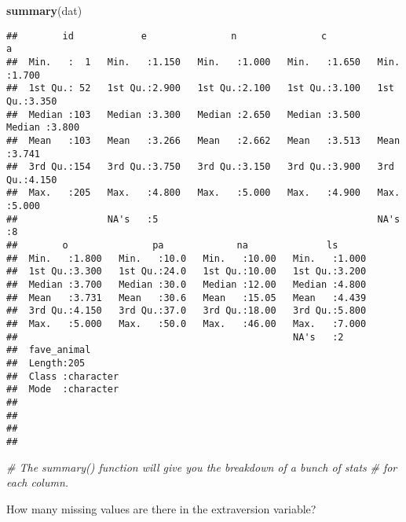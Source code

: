 \documentclass[
]{article}
\newenvironment{Shaded}{\begin{snugshade}}{\end{snugshade}}
\newcommand{\CommentTok}[1]{\textcolor[rgb]{0.56,0.35,0.01}{\textit{#1}}}
\newcommand{\FunctionTok}[1]{\textcolor[rgb]{0.13,0.29,0.53}{\textbf{#1}}}
\newcommand{\NormalTok}[1]{#1}
\newcommand{\SpecialCharTok}[1]{\textcolor[rgb]{0.81,0.36,0.00}{\textbf{#1}}}
\begin{document}
\begin{Shaded}
\begin{Highlighting}[]
\FunctionTok{summary}\NormalTok{(dat)}
\end{Highlighting}
\end{Shaded}

\begin{verbatim}
##        id            e               n               c               a        
##  Min.   :  1   Min.   :1.150   Min.   :1.000   Min.   :1.650   Min.   :1.700  
##  1st Qu.: 52   1st Qu.:2.900   1st Qu.:2.100   1st Qu.:3.100   1st Qu.:3.350  
##  Median :103   Median :3.300   Median :2.650   Median :3.500   Median :3.800  
##  Mean   :103   Mean   :3.266   Mean   :2.662   Mean   :3.513   Mean   :3.741  
##  3rd Qu.:154   3rd Qu.:3.750   3rd Qu.:3.150   3rd Qu.:3.900   3rd Qu.:4.150  
##  Max.   :205   Max.   :4.800   Max.   :5.000   Max.   :4.900   Max.   :5.000  
##                NA's   :5                                       NA's   :8      
##        o               pa             na              ls       
##  Min.   :1.800   Min.   :10.0   Min.   :10.00   Min.   :1.000  
##  1st Qu.:3.300   1st Qu.:24.0   1st Qu.:10.00   1st Qu.:3.200  
##  Median :3.700   Median :30.0   Median :12.00   Median :4.800  
##  Mean   :3.731   Mean   :30.6   Mean   :15.05   Mean   :4.439  
##  3rd Qu.:4.150   3rd Qu.:37.0   3rd Qu.:18.00   3rd Qu.:5.800  
##  Max.   :5.000   Max.   :50.0   Max.   :46.00   Max.   :7.000  
##                                                 NA's   :2      
##  fave_animal       
##  Length:205        
##  Class :character  
##  Mode  :character  
##                    
##                    
##                    
## 
\end{verbatim}

\begin{Shaded}
\begin{Highlighting}[]
\CommentTok{\# The summary() function will give you the breakdown of a bunch of stats}
\CommentTok{\# for each column.}
\end{Highlighting}
\end{Shaded}

How many missing values are there in the extraversion variable?

\begin{Shaded}
\end{Shaded}
\end{document}
